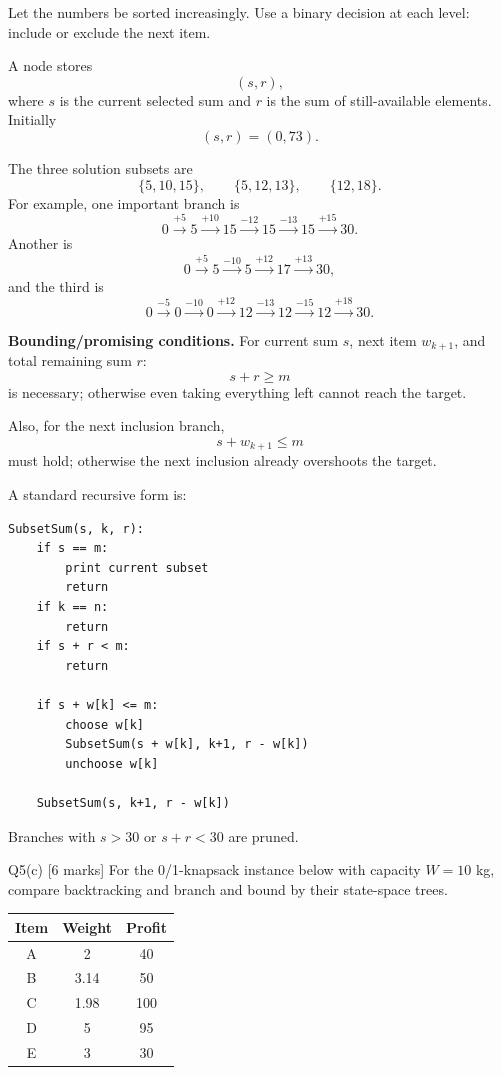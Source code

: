 \documentclass[10.5pt,a4paper]{article}
\begin{document}
\begin{answerbox}
Let the numbers be sorted increasingly. Use a binary decision at each level: include or exclude the next item.

A node stores
\[
(s,r),
\]
where $s$ is the current selected sum and $r$ is the sum of still-available elements. Initially
\[
(s,r)=(0,73).
\]

The three solution subsets are
\[
\boxed{\{5,10,15\}},\qquad
\boxed{\{5,12,13\}},\qquad
\boxed{\{12,18\}}.
\]
For example, one important branch is
\[
0\xrightarrow{+5}5\xrightarrow{+10}15\xrightarrow{-12}15
\xrightarrow{-13}15\xrightarrow{+15}\boxed{30}.
\]
Another is
\[
0\xrightarrow{+5}5\xrightarrow{-10}5\xrightarrow{+12}17
\xrightarrow{+13}\boxed{30},
\]
and the third is
\[
0\xrightarrow{-5}0\xrightarrow{-10}0\xrightarrow{+12}12
\xrightarrow{-13}12\xrightarrow{-15}12\xrightarrow{+18}\boxed{30}.
\]

\textbf{Bounding/promising conditions.} For current sum $s$, next item $w_{k+1}$, and total remaining sum $r$:
\[
\boxed{s+r\ge m}
\]
is necessary; otherwise even taking everything left cannot reach the target.

Also, for the next inclusion branch,
\[
\boxed{s+w_{k+1}\le m}
\]
must hold; otherwise the next inclusion already overshoots the target.

A standard recursive form is:
\begin{lstlisting}
SubsetSum(s, k, r):
    if s == m:
        print current subset
        return
    if k == n:
        return
    if s + r < m:
        return

    if s + w[k] <= m:
        choose w[k]
        SubsetSum(s + w[k], k+1, r - w[k])
        unchoose w[k]

    SubsetSum(s, k+1, r - w[k])
\end{lstlisting}
Branches with $s>30$ or $s+r<30$ are pruned.
\end{answerbox}

\begin{questionbox}{Q5(c) [6 marks]}
For the 0/1-knapsack instance below with capacity $W=10$ kg, compare backtracking and branch and bound by their state-space trees.

\begin{center}
\begin{tabular}{c c c}
\toprule
Item & Weight & Profit\\
\midrule
A&2&40\\
B&3.14&50\\
C&1.98&100\\
D&5&95\\
E&3&30\\
\bottomrule
\end{tabular}
\end{center}
\end{questionbox}
\end{document}
